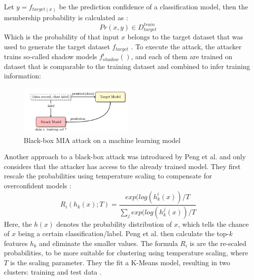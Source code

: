  Let $y = f_{target(x)}$ be the prediction confidence of a classification model, then the membership probability is calculated as \citep{shokri_membership_2017}: 
\begin{equation}
    Pr(x, y) \in D^{train}_{target}
\end{equation}
Which is the probability of that input $x$ belongs to the target dataset that was used to generate the target dataset $f_{target}$ \citep{shokri_membership_2017}.
To execute the attack, the attacker trains so-called shadow models $f^i_{shadow}()$, and each of them are trained on dataset that is comparable to the training dataset and combined to infer training information:
\begin{figure}[H]
  \includegraphics[width=0.5\textwidth]{TheorethicalFramework/AttacksOnPrivacy/shadow-models-mi.png}
  \caption{Black-box MIA attack on a machine learning model \citep{shokri_membership_2017}}
\end{figure}

Another approach to a black-box attack was introduced by Peng et al. and only considers that the attacker has access to the already trained model.
They first rescale the probabilities using temperature scaling to compensate for overconfident models \citep{peng_unsupervised_nodate}:
\begin{equation}
    R_i(h_k(x);T) = \frac{exp(log(h^i_k(x))/T}{\sum_j{exp(log(h^j_k(x))/T}}
\end{equation}
Here, the $h(x)$ denotes the probability distribution of $x$, which tells the chance of $x$ being a certain classification/label. Peng et al. then calculate the top-$k$ features $h_k$ and eliminate the smaller values. 
The formula $R_i$ is are the re-scaled probabilities,  to be more suitable for clustering using temperature scaling, where $T$ is the scaling parameter.  They the fit a K-Means model, resulting in two clusters: training and test data \citep{peng_unsupervised_nodate}.

